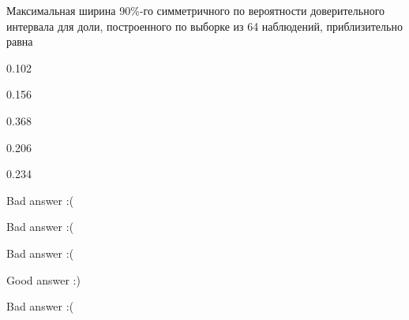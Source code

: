 
\begin{question}
Максимальная ширина 90\%-го симметричного по вероятности доверительного
интервала для доли, построенного по выборке из 64 наблюдений,
приблизительно равна
\begin{answerlist}
  \item 0.102
  \item 0.156
  \item 0.368
  \item 0.206
  \item 0.234
\end{answerlist}
\end{question}

\begin{solution}
\begin{answerlist}
  \item Bad answer :(
  \item Bad answer :(
  \item Bad answer :(
  \item Good answer :)
  \item Bad answer :(
\end{answerlist}
\end{solution}

